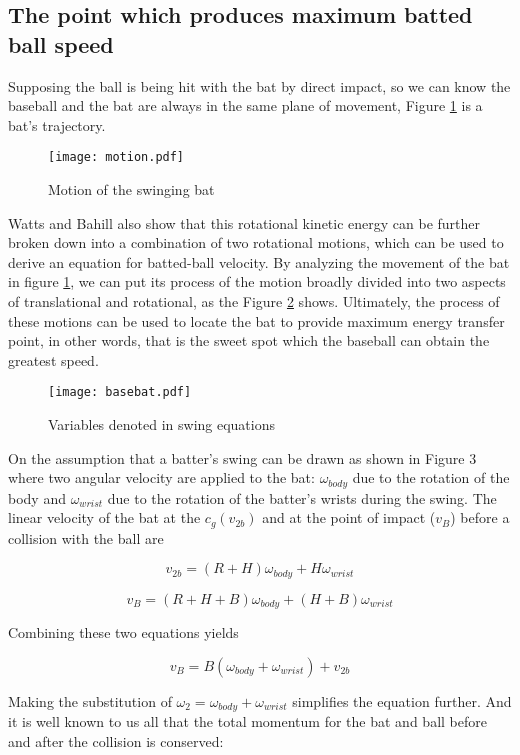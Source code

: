 \subsection{The point which produces maximum batted ball speed}

Supposing the ball is being hit with the bat by direct impact, so we can know the baseball and the bat are always in the same plane of movement, Figure \ref{Motion} is a bat's trajectory\cite{EvaluatePredict}.

\begin{figure}[!htb]
\centering
\texttt{[image: motion.pdf]}
\caption{\label{Motion}Motion of the swinging bat}
\end{figure}

Watts and Bahill also show that this rotational kinetic energy can be further broken down into a combination of two rotational motions, which can be used to derive an equation for batted-ball velocity. By analyzing the movement of the bat in figure \ref{Motion}, we can put its process of the motion broadly divided into two aspects of translational and rotational, as the Figure \ref{Varibales} shows. Ultimately, the process of these motions can be used to locate the bat to provide maximum energy transfer point, in other words, that is the sweet spot which the baseball can obtain the greatest speed.

\begin{figure}[!htb]
\centering
\texttt{[image: basebat.pdf]}
\caption{\label{Varibales}Variables denoted in swing equations}
\end{figure}


On the assumption that a batter's swing can be drawn as shown in Figure 3 where two angular velocity are applied to the bat: $\omega_{body}$ due to the rotation of the body and $\omega_{wrist}$ due to the rotation of the batter's wrists during the swing. The linear velocity of the bat at the $c_g (v_{2b})$ and at the point of impact ($v_B$) before a collision with the ball are

\[
v_{2b}=(R+H)\omega_{body}+H\omega_{wrist}
\]

\[
v_B=(R+H+B)\omega_{body}+(H+B)\omega_{wrist}
\]

Combining these two equations yields

\[
v_B=B(\omega_{body}+\omega_{wrist})+v_{2b}
\]

Making the substitution of $\omega_2 = \omega_{body} + \omega_{wrist}$ simplifies the equation further. And it is well known to us all that the total momentum for the bat and ball before and after the collision is conserved:

